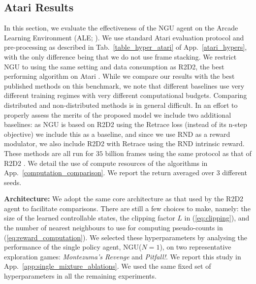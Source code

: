 \documentclass{article} %
\begin{document}
\subsection{Atari Results}
\label{montezuma_learned}
In this section, we evaluate the effectiveness of the NGU agent on the Arcade Learning Environment (ALE; \citep{bellemare2013arcade}).
%
We use standard Atari evaluation protocol and pre-processing as described in Tab.~\ref{table_hyper_atari} of App.~\ref{atari_hypers}, with the only difference being that we do not use frame stacking.
%
We restrict NGU to using the same setting and data consumption as R2D2, the best performing algorithm on Atari \citep{r2d2}.
%
While we compare our results with the best published methods on this benchmark, we note that different baselines use very different training regimes with very different computational budgets.
%
Comparing distributed and non-distributed methods is in general difficult.
%
In an effort to properly assess the merits of the proposed model we include two additional baselines: as NGU is based on R2D2 using the Retrace loss (instead of its n-step objective) we include this as a baseline, and since we use RND as a reward modulator, we also include R2D2 with Retrace using the RND intrinsic reward.
These methods are all run for $35$ billion frames using the same protocol as that of R2D2 \citep{r2d2}.
%
We detail the use of compute resources of the algorithms in App.~\ref{computation_comparison}. We report the return averaged over $3$ different seeds.

{\bf Architecture:} We adopt the same core architecture as that used by the R2D2 agent to facilitate comparisons. There are still a few choices to make, namely: the size of the learned controllable states, the clipping factor $L$ in (\ref{eq:clipping}), and the number of nearest neighbours to use for computing pseudo-counts in  (\ref{eq:reward_computation}).
%
We selected these hyperparameters by analysing the performance of the single policy agent, NGU($N=1$), on two representative exploration games: \textit{Montezuma's Revenge} and \textit{Pitfall!}. We report this study in App.~\ref{app:single_mixture_ablations}. We used the same fixed set of hyperparameters in all the remaining experiments.
\end{document}
